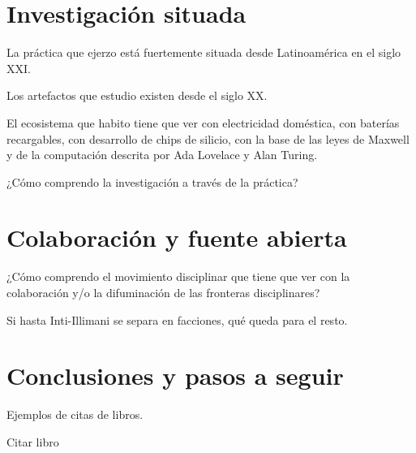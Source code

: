 \documentclass{article}
\begin{document}
\section{Investigación situada}

La práctica que ejerzo está fuertemente situada desde Latinoamérica en el siglo XXI.

Los artefactos que estudio existen desde el siglo XX.

El ecosistema que habito tiene que ver con electricidad doméstica, con baterías recargables, con desarrollo de chips de silicio, con la base de las leyes de Maxwell y de la computación descrita por Ada Lovelace y Alan Turing.


¿Cómo comprendo la investigación a través de la práctica?

\section{Colaboración y fuente abierta}

¿Cómo comprendo el movimiento disciplinar que tiene que ver con la colaboración y/o la difuminación de las fronteras disciplinares?

Si hasta Inti-Illimani se separa en facciones, qué queda para el resto.

\section{Conclusiones y pasos a seguir}

Ejemplos de citas de libros.

Citar libro \cite{korgBerlin}


\printbibliography[title={Bibliografía}, heading=bibintoc]
\end{document}
